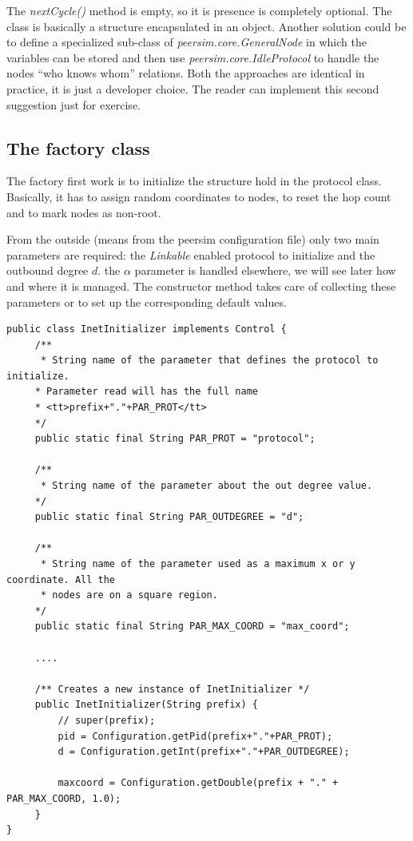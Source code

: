 \documentclass[a4paper,12pt]{article}
\begin{document}
The \emph{nextCycle()} method is empty, so it is presence is completely 
optional. The class is basically a structure encapsulated in an
object. Another solution could be to define a specialized sub-class of
\emph{peersim.core.GeneralNode} in which the variables can be stored
and then use \emph{peersim.core.IdleProtocol} to handle the nodes
``who knows whom'' relations. Both the approaches are identical in
practice, it is just a developer choice. The reader can implement this
second suggestion just for exercise.


\subsection{The factory class}

The factory first work is to initialize the structure hold in the
protocol class. Basically, it has to assign random coordinates to
nodes, to reset the hop count and to mark nodes as non-root.

From the outside (means from the peersim configuration file) only two 
main parameters are required: the \emph{Linkable} enabled protocol to
initialize and the outbound degree $d$. the $\alpha$ parameter is
handled elsewhere, we will see later how and where it is managed. 
The constructor method 
takes care of collecting these parameters or to set up the corresponding 
default values.

\footnotesize
\begin{verbatim}
public class InetInitializer implements Control {
     /** 
      * String name of the parameter that defines the protocol to initialize.
     * Parameter read will has the full name
     * <tt>prefix+"."+PAR_PROT</tt>
     */
     public static final String PAR_PROT = "protocol";
 
     /**
      * String name of the parameter about the out degree value.
     */
     public static final String PAR_OUTDEGREE = "d";
     
     /**
      * String name of the parameter used as a maximum x or y coordinate. All the 
      * nodes are on a square region.
     */
     public static final String PAR_MAX_COORD = "max_coord";
    
     ....
     
     /** Creates a new instance of InetInitializer */
     public InetInitializer(String prefix) {
         // super(prefix);
         pid = Configuration.getPid(prefix+"."+PAR_PROT);
         d = Configuration.getInt(prefix+"."+PAR_OUTDEGREE);
         
         maxcoord = Configuration.getDouble(prefix + "." + PAR_MAX_COORD, 1.0);
     }
}
\end{verbatim}
\normalsize
     
\end{document}
